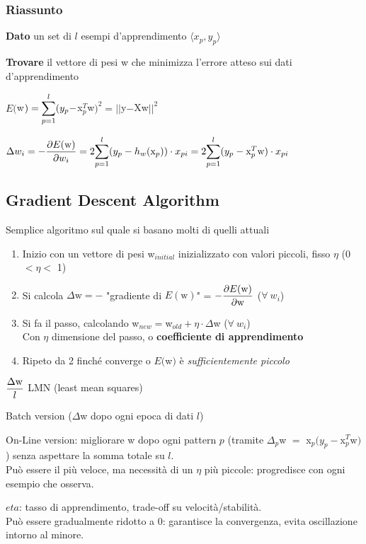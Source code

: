 \documentclass[10pt]{book}
\begin{document}
\subsubsection{Riassunto}
\begin{list}{}{}
	\item \textbf{Dato} un set di $l$ esempi d'apprendimento $\langle x_p, y_p\rangle$
	\item \textbf{Trovare} il vettore di pesi w che minimizza l'errore atteso sui dati d'apprendimento
	\begin{list}{}{}
		\item $E($w$) = \mathlarger{\sum_{p=1}^l} (y_p -$x$_p^T$w$)^2 = ||$y$-$Xw$||^2$
		\item $\Delta w_i = \mathlarger{-\frac{\partial E(\text{w})}{\partial w_i}} = 2\mathlarger{\sum_{p=1}^l}(y_p - h_w(\text{x}_p))\cdot x_{pi} = 2\mathlarger{\sum_{p=1}^l}(y_p - \text{x}_p^T\text{w})\cdot x_{pi}$
	\end{list}
\end{list}
\subsection{Gradient Descent Algorithm}
Semplice algoritmo sul quale si basano molti di quelli attuali
\begin{enumerate}
	\item Inizio con un vettore di pesi w$_{initial}$ inizializzato con valori piccoli, fisso $\eta$ (0 $< \eta <$ 1)
	\item Si calcola $\Delta \text{w} = -$ "gradiente di $E(\text{w})$" = $\mathlarger{- \frac{\partial E(\text{w})}{\partial \text{w}}}$ ($\forall\:w_i$)
	\item Si fa il passo, calcolando w$_{new} = $w$_{old} + \eta\cdot\Delta$w ($\forall\:w_i$)\\
	Con $\eta$ dimensione del passo, o \textbf{coefficiente di apprendimento}
	\item Ripeto da 2 finché converge o $E($w$)$ è \textit{sufficientemente piccolo}
\end{enumerate}
\begin{list}{}{}
	\item $\mathlarger{\frac{\Delta \text{w}}{l}}$ LMN (least mean squares)
	\item Batch version ($\Delta$w dopo ogni epoca di dati $l$)
	\item On-Line version: migliorare w dopo ogni pattern $p$ (tramite $\Delta_p$w $ = $ x$_p(y_p - $x$_p^T$w$)$) senza aspettare la somma totale su $l$.\\
	Può essere il più veloce, ma necessità di un $\eta$ più piccole: progredisce con ogni esempio che osserva.
	\item $eta$: tasso di apprendimento, trade-off su velocità/stabilità.\\
	Può essere gradualmente ridotto a 0: garantisce la convergenza, evita oscillazione intorno al minore.
\end{list}
\end{document}
